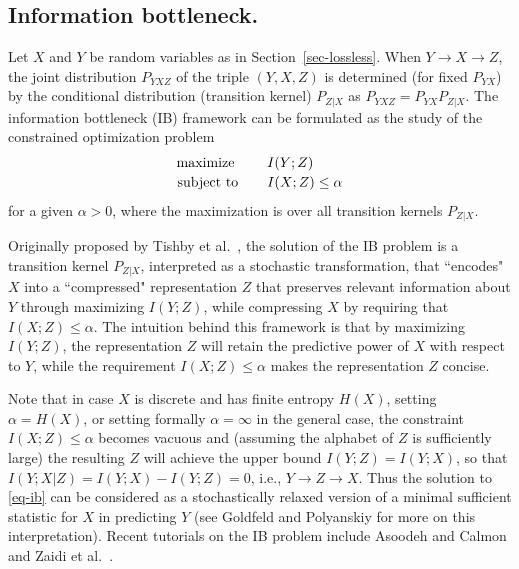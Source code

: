 \documentclass[11pt]{article}
\newcounter{aid}
\begin{document}
\subsection{Information bottleneck.}
\label{sec-ib} 
Let $X$ and $Y$ be random variables as in Section~\ref{sec-lossless}. When $Y\to X\to Z$,  the joint distribution $P_{YXZ}$ of the triple $(Y,X,Z)$ is determined (for fixed $P_{YX}$) by the conditional distribution (transition kernel)  $P_{Z|X}$ as $P_{YXZ}=P_{YX}P_{Z|X}$. The information bottleneck (IB) framework can be formulated as 
the study of the  constrained optimization problem
\begin{equation}
\label{eq-ib}
\begin{array}{cl}
  \text{maximize \ \ \ }   &  I(Y;Z)  \\
             &  \vspace{-10pt} \\
    \text{subject to\ \ \ }  &  I(X;Z)  \le  \alpha 
\end{array}
\end{equation}
for a given $\alpha> 0$, where the maximization  is over all transition kernels $P_{Z|X}$. 

Originally proposed  by Tishby et al.\  \cite{TiPeBi99}, the solution of the IB problem is a transition kernel $P_{Z|X}$, interpreted as a stochastic transformation,  that ``encodes" $X$ into a ``compressed" representation $Z$ that preserves relevant information about  $Y$ through maximizing $ I(Y;Z)$, while  compressing $X$ by requiring that $I(X;Z)\le \alpha$. The intuition behind this framework is that by maximizing $I(Y;Z)$, the representation $Z$ will retain the predictive power of $X$  with respect to $Y$, while the requirement $ I(X;Z) \le \alpha $ makes the representation $Z$ concise. 

Note that in case $X$ is discrete and has finite entropy $H(X)$,  setting $\alpha = H(X)$, or setting formally $\alpha=\infty$ in the general case, the constraint $ I(X;Z)  \le  \alpha $ becomes vacuous and (assuming the alphabet of $Z$ is sufficiently large) the resulting $Z$ will achieve the  upper bound  $I(Y;Z)= I(Y;X)$, so that  $I(Y;X|Z)=I(Y;X)-I(Y;Z)=0$, i.e., $Y\to Z\to X$. Thus the solution to \eqref{eq-ib} can be considered as a stochastically relaxed version of a minimal sufficient statistic for $X$ in predicting $Y$ (see  Goldfeld and Polyanskiy \cite[Section~II.C]{GoPo20} for more on this interpretation). Recent tutorials on the IB problem include  Asoodeh and  Calmon \cite{AsCa20} and Zaidi et al.\ \cite{Zai-etal20}. 
\end{document}
